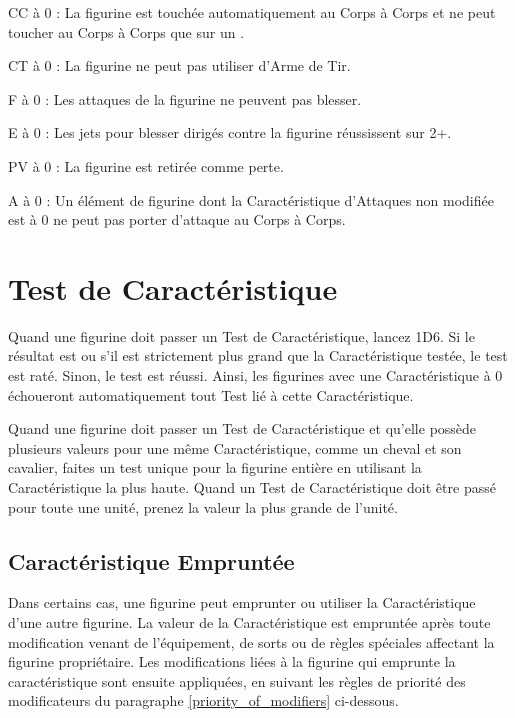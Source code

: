 \noindent CC à 0 : La figurine est touchée automatiquement au Corps à Corps et ne peut toucher au Corps à Corps que sur un .

\noindent CT à 0 : La figurine ne peut pas utiliser d'Arme de Tir.

\noindent F à 0 : Les attaques de la figurine ne peuvent pas blesser.

\noindent E à 0 : Les jets pour blesser dirigés contre la figurine réussissent sur 2+.

\noindent PV à 0 : La figurine est retirée comme perte.

\noindent A à 0 : Un élément de figurine dont la Caractéristique d'Attaques non modifiée est à 0 ne peut pas porter d'attaque au Corps à Corps.

\newpage
\section{Test de Caractéristique}

Quand une figurine doit passer un Test de Caractéristique, lancez 1D6. Si le résultat est  ou s'il est strictement plus grand que la Caractéristique testée, le test est raté. Sinon, le test est réussi. Ainsi, les figurines avec une Caractéristique à 0 échoueront automatiquement tout Test lié à cette Caractéristique.

Quand une figurine doit passer un Test de Caractéristique et qu'elle possède plusieurs valeurs pour une même Caractéristique, comme un cheval et son cavalier, faites un test unique pour la figurine entière en utilisant la Caractéristique la plus haute. Quand un Test de Caractéristique doit être passé pour toute une unité, prenez la valeur la plus grande de l'unité.

\subsection{Caractéristique Empruntée}
\label{borrowed_characteristics}

Dans certains cas,  une figurine peut emprunter ou utiliser la Caractéristique d'une autre figurine. La valeur de la Caractéristique est empruntée après toute modification venant de l'équipement, de sorts ou de règles spéciales affectant la figurine propriétaire. Les modifications liées à la figurine qui emprunte la caractéristique sont ensuite appliquées, en suivant les règles de priorité des modificateurs du paragraphe \ref{priority_of_modifiers} ci-dessous.

